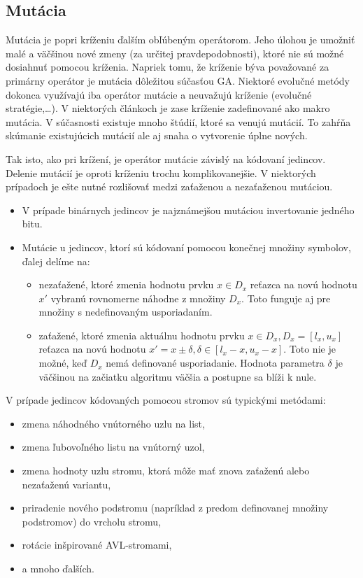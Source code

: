 \subsection{Mutácia}\label{kap2:2.5:2.5.1:Mutation}
Mutácia je popri kríženiu ďalším obľúbeným operátorom. Jeho úlohou je umožniť malé a väčšinou nové zmeny (za určitej pravdepodobnosti), ktoré nie sú možné dosiahnuť pomocou kríženia. Napriek tomu, že kríženie býva považované za primárny operátor je mutácia dôležitou súčasťou GA. Niektoré evolučné metódy dokonca využívajú iba operátor mutácie a neuvažujú kríženie (evolučné stratégie,\ldots). V niektorých článkoch je zase kríženie zadefinované ako makro mutácia. V súčasnosti existuje mnoho štúdií, ktoré sa venujú mutácií. To zahŕňa skúmanie existujúcich mutácií ale aj snaha o vytvorenie úplne nových. 

Tak isto, ako pri krížení, je operátor mutácie závislý na kódovaní jedincov. Delenie mutácií je oproti kríženiu trochu komplikovanejšie. V niektorých prípadoch je ešte nutné rozlišovať medzi zaťaženou a nezaťaženou mutáciou. 
\begin{itemize}
\item V prípade binárnych jedincov je najznámejšou mutáciou invertovanie jedného bitu.
\item Mutácie u jedincov, ktorí sú kódovaní pomocou konečnej množiny symbolov, ďalej delíme na:
\begin{itemize}
\item nezaťažené, ktoré zmenia hodnotu prvku $x \in D_x$ reťazca na novú hodnotu $x'$ vybranú rovnomerne náhodne z množiny $D_x$. Toto funguje aj pre množiny s nedefinovaným usporiadaním.
\item zaťažené, ktoré zmenia aktuálnu hodnotu prvku $x \in D_x, D_x = [l_x,u_x]$ reťazca na novú hodnotu $x' = x \pm \delta, \delta \in [l_x - x, u_x - x]$. Toto nie je možné, keď $D_x$ nemá definované usporiadanie. Hodnota parametra $\delta$ je väčšinou na začiatku algoritmu väčšia a postupne sa blíži k nule.
\end{itemize}
\end{itemize}
V prípade jedincov kódovaných pomocou stromov sú typickými metódami:
\begin{itemize}
\item zmena náhodného vnútorného uzlu na list,
\item zmena ľubovoľného listu na vnútorný uzol,
\item zmena hodnoty uzlu stromu, ktorá môže mať znova zaťaženú alebo nezaťaženú variantu,
\item priradenie nového podstromu (napríklad z predom definovanej množiny podstromov) do vrcholu stromu,
\item rotácie inšpirované AVL-stromami,
\item a mnoho ďalších.
\end{itemize}

